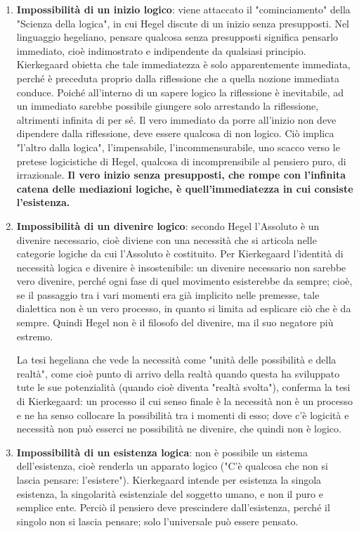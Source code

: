 \begin{enumerate}
	
	\item \textbf{Impossibilità di un inizio logico}: viene attaccato il "cominciamento" della "Scienza della logica", in cui Hegel discute di un inizio senza presupposti. Nel linguaggio hegeliano, pensare qualcosa senza presupposti significa pensarlo immediato, cioè indimostrato e indipendente da qualsiasi principio. Kierkegaard obietta che tale immediatezza è solo apparentemente immediata, perché è preceduta  proprio dalla riflessione che a quella nozione immediata conduce. Poiché all'interno di un sapere logico la riflessione è inevitabile, ad un immediato sarebbe possibile giungere solo arrestando la riflessione, altrimenti infinita di per sé. Il vero immediato da porre all'inizio non deve dipendere dalla riflessione, deve essere qualcosa di non logico. Ciò implica "l'altro dalla logica", l'impensabile, l'incommensurabile, uno scacco verso le pretese logicistiche di Hegel, qualcosa di incomprensibile al pensiero puro, di irrazionale.\textbf{ Il vero inizio senza presupposti, che rompe con l'infinita catena delle mediazioni logiche, è quell'immediatezza in cui consiste l'esistenza.}

	\item \textbf{Impossibilità di un divenire logico}: secondo Hegel l'Assoluto è un divenire necessario, cioè diviene con una necessità che si articola nelle categorie logiche da cui l'Assoluto è costituito. Per Kierkegaard l'identità di necessità logica e divenire è insostenibile: un divenire necessario non sarebbe vero divenire, perché ogni fase di quel movimento esisterebbe da sempre; cioè, se il passaggio tra i vari momenti era già implicito nelle premesse, tale dialettica non è un vero processo, in quanto si limita ad esplicare ciò che è da sempre. Quindi Hegel non è il filosofo del divenire, ma il suo negatore più estremo. 
	
	La tesi hegeliana che vede la necessità come "unità delle possibilità e della realtà", come cioè punto di arrivo della realtà quando questa ha sviluppato tute le sue potenzialità (quando cioè diventa "realtà svolta"), conferma la tesi di Kierkegaard: un processo il cui senso finale è la necessità non è un processo e ne ha senso collocare la possibilità tra i momenti di esso; dove c'è logicità e necessità non può esserci ne possibilità ne divenire, che quindi non è logico.
	
	\item \textbf{Impossibilità di un esistenza logica}: non è possibile un sistema dell'esistenza, cioè renderla un apparato logico ("C'è qualcosa che non si lascia pensare: l'esistere"). Kierkegaard intende per esistenza la singola esistenza, la singolarità esistenziale del soggetto umano, e non il puro e semplice ente. Perciò il pensiero deve prescindere dall'esistenza, perché il singolo non si lascia pensare; solo l'universale può essere pensato.
	
\end{enumerate}

